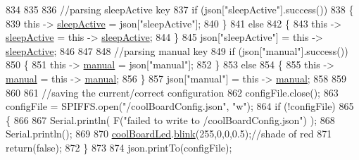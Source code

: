\begin{DoxyCode}
834 
835             
836             \textcolor{comment}{//parsing sleepActive key}
837             \textcolor{keywordflow}{if} (json[\textcolor{stringliteral}{"sleepActive"}].success())
838             \{
839                 \textcolor{keyword}{this} -> \hyperlink{class_cool_board_a0a51b2287139f66c738101fb53139230}{sleepActive} = json[\textcolor{stringliteral}{"sleepActive"}];
840             \}
841             \textcolor{keywordflow}{else}
842             \{
843                 \textcolor{keyword}{this} -> \hyperlink{class_cool_board_a0a51b2287139f66c738101fb53139230}{sleepActive} = \textcolor{keyword}{this} -> \hyperlink{class_cool_board_a0a51b2287139f66c738101fb53139230}{sleepActive};
844             \}
845             json[\textcolor{stringliteral}{"sleepActive"}] = \textcolor{keyword}{this} -> \hyperlink{class_cool_board_a0a51b2287139f66c738101fb53139230}{sleepActive};
846 
847 
848             \textcolor{comment}{//parsing manual key}
849             \textcolor{keywordflow}{if} (json[\textcolor{stringliteral}{"manual"}].success())
850             \{
851                 \textcolor{keyword}{this} -> \hyperlink{class_cool_board_a7c8e505a5804b109e112d5a03df6ea2b}{manual} = json[\textcolor{stringliteral}{"manual"}];
852             \}
853             \textcolor{keywordflow}{else}
854             \{
855                 \textcolor{keyword}{this} -> \hyperlink{class_cool_board_a7c8e505a5804b109e112d5a03df6ea2b}{manual} = \textcolor{keyword}{this} -> \hyperlink{class_cool_board_a7c8e505a5804b109e112d5a03df6ea2b}{manual};
856             \}
857             json[\textcolor{stringliteral}{"manual"}] = \textcolor{keyword}{this} -> \hyperlink{class_cool_board_a7c8e505a5804b109e112d5a03df6ea2b}{manual};
858 
859 
860 
861             \textcolor{comment}{//saving the current/correct configuration}
862             configFile.close();
863             configFile = SPIFFS.open(\textcolor{stringliteral}{"/coolBoardConfig.json"}, \textcolor{stringliteral}{"w"});
864             \textcolor{keywordflow}{if} (!configFile)
865             \{
866             
867                 Serial.println( F(\textcolor{stringliteral}{"failed to write to /coolBoardConfig.json"}) );
868                 Serial.println();
869 
870                 \hyperlink{class_cool_board_a1b1d3c684a5baa56b08486e192fd8e97}{coolBoardLed}.\hyperlink{class_cool_board_led_a96e1ea13003eee34c9dbcef340404426}{blink}(255,0,0,0.5);\textcolor{comment}{//shade of red     }
871                 \textcolor{keywordflow}{return}(\textcolor{keyword}{false});
872             \}
873 
874             json.printTo(configFile);

\end{DoxyCode}
